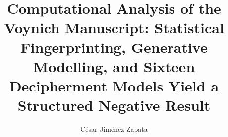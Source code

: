 \documentclass[numsec,webpdf,modern,medium,namedate]{oup-authoring-template}
\begin{document}


\title[Computational Analysis of the Voynich Manuscript]{Computational Analysis of the Voynich Manuscript: Statistical Fingerprinting, Generative Modelling, and Sixteen Decipherment Models Yield a Structured Negative Result}

\author[1,$\ast$]{C\'esar Jim\'enez Zapata}


\address[1]{, }



\abstract{

}

\keywords{}

\maketitle





\end{document}
